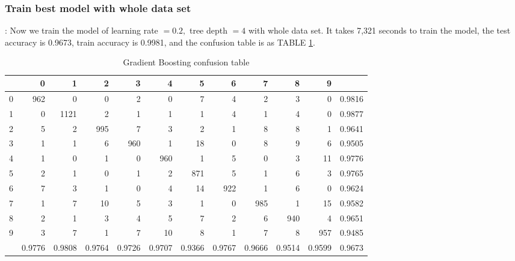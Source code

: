 \documentclass[8pt]{beamer}
\begin{document}
\subsubsection{Train best model with whole data set}
\begin{frame}[allowframebreaks]{\secname : \subsecname}{\subsubsecname}
Now we train the model of learning rate $=0.2,$ tree depth $=4$ with whole data set. It takes 7,321 seconds to train the model, the test accuracy is 0.9673, train accuracy is 0.9981, and the confusion table is as TABLE \ref{tab:Gradient Boosting confusion table}.


\begin{table}[htbp]
\tiny
  \centering
  \caption{Gradient Boosting confusion table}
\begin{tabular}{|r|rrrrrrrrrr|r|}
\hline
  & 0 & 1 & 2 & 3 & 4 & 5 & 6 & 7 & 8 & 9 &  \\
\hline
0 & 962 & 0 & 0 & 2 & 0 & 7 & 4 & 2 & 3 & 0 & 0.9816 \\
1 & 0 & 1121 & 2 & 1 & 1 & 1 & 4 & 1 & 4 & 0 & 0.9877 \\
2 & 5 & 2 & 995 & 7 & 3 & 2 & 1 & 8 & 8 & 1 & 0.9641 \\
3 & 1 & 1 & 6 & 960 & 1 & 18 & 0 & 8 & 9 & 6 & 0.9505 \\
4 & 1 & 0 & 1 & 0 & 960 & 1 & 5 & 0 & 3 & 11 & 0.9776 \\
5 & 2 & 1 & 0 & 1 & 2 & 871 & 5 & 1 & 6 & 3 & 0.9765 \\
6 & 7 & 3 & 1 & 0 & 4 & 14 & 922 & 1 & 6 & 0 & 0.9624 \\
7 & 1 & 7 & 10 & 5 & 3 & 1 & 0 & 985 & 1 & 15 & 0.9582 \\
8 & 2 & 1 & 3 & 4 & 5 & 7 & 2 & 6 & 940 & 4 & 0.9651 \\
9 & 3 & 7 & 1 & 7 & 10 & 8 & 1 & 7 & 8 & 957 & 0.9485 \\
\hline
  & 0.9776 & 0.9808 & 0.9764 & 0.9726 & 0.9707 & 0.9366 & 0.9767 & 0.9666 & 0.9514 & 0.9599 & 0.9673 \\
\hline
\end{tabular}%
 \label{tab:Gradient Boosting confusion table}%
\end{table}%
\end{frame}
\end{document}
